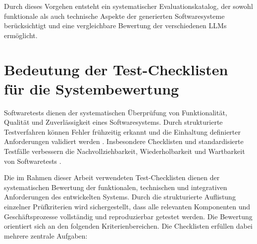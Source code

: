 Durch dieses Vorgehen entsteht ein systematischer
Evaluationskatalog, der sowohl funktionale als auch
technische Aspekte der generierten Softwaresysteme
berücksichtigt und eine vergleichbare Bewertung der
verschiedenen LLMs ermöglicht.

\section{Bedeutung der Test-Checklisten für die Systembewertung}

Softwaretests dienen der systematischen Überprüfung von Funktionalität, Qualität und Zuverlässigkeit eines Softwaresystems. Durch strukturierte Testverfahren können Fehler frühzeitig erkannt und die Einhaltung definierter Anforderungen validiert werden \cite{Ammann2017}. 
Insbesondere Checklisten und standardisierte Testfälle verbessern die Nachvollziehbarkeit, Wiederholbarkeit und Wartbarkeit von Softwaretests \cite{ISTQB2018}.

Die im Rahmen dieser Arbeit verwendeten Test-Checklisten dienen der systematischen Bewertung der funktionalen, technischen und integrativen Anforderungen des entwickelten Systems. Durch die strukturierte Auflistung einzelner Prüfkriterien wird sichergestellt, dass alle relevanten Komponenten und Geschäftsprozesse vollständig und reproduzierbar getestet werden.
\newpage
Die Bewertung orientiert sich an den folgenden Kriterienbereichen. Die Checklisten erfüllen dabei mehrere zentrale Aufgaben:


